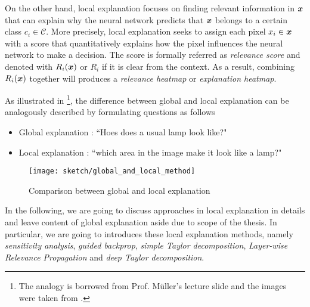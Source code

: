 On the other hand, local explanation focuses on finding relevant information in $\patvector{x}$ that can explain why the neural network predicts that $\boldsymbol{x}$ belongs to a certain class $c_i \in \mathcal{C}$.  More precisely, local explanation seeks to assign each pixel $x_i \in \patvector{x}$ with a score that quantitatively explains how the pixel influences the neural network to make a decision. The score is formally referred as \textit{relevance score} and denoted with $R_i(\boldsymbol{x})$ or $R_i$ if it is clear from the context. As a result, combining $R_i(\boldsymbol{x})$ together will produces a \textit{relevance heatmap} or \textit{explanation heatmap}.

As illustrated in \addfigure{\ref{fig:comparision_between_global_and_local_analysis}}\footnote{The analogy is borrowed from Prof. M\"{u}ller's lecture slide and the images were taken from \cite{NguyenSynthesizingpreferredinputs2016a, BachPixelWiseExplanationsNonLinear2015}.}, the difference between global and local explanation can be analogously described by formulating questions as follows
\begin{itemize}
	\item Global explanation : ``Hoes does a usual lamp look like?"
    \item Local explanation : ``which area in the image make it look like a lamp?" 
\end{itemize}

 \begin{figure}[!hbt]
\centering
\texttt{[image: sketch/global\_and\_local\_method]}
\caption{Comparison between global and local explanation}
\label{fig:comparision_between_global_and_local_analysis}
\end{figure}

In the following, we are going to discuss approaches in local explanation in details and leave content of global explanation aside due to scope of the thesis. In particular, we are going to introduces these local explanation methods, namely \textit{sensitivity analysis}, \textit{guided backprop}, \textit{simple Taylor decomposition}, \textit{Layer-wise Relevance Propagation} and \textit{deep Taylor decomposition}.


%

